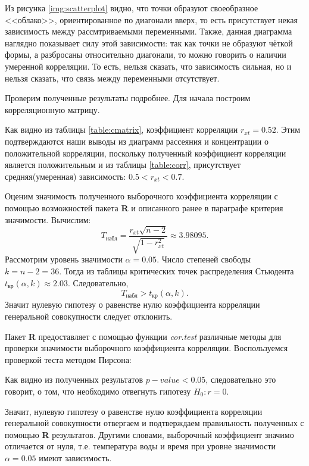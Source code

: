 Из рисунка \ref{img:scatterplot} видно, что точки образуют своеобразное <<облако>>, ориентированное по диагонали вверх, то есть присутствует некая зависимость между рассмтриваемыми переменными. Также, данная диаграмма наглядно показывает силу этой зависимости: так как точки не образуют чёткой формы, а разбросаны относительно диагонали, то можно говорить о наличии умеренной корреляции. То есть, нельзя сказать, что зависимость сильная, но и нельзя сказать, что связь между переменными отсутствует.

Проверим полученные результаты подробнее. Для начала построим корреляционную матрицу.

Как видно из таблицы \ref{table:cmatrix}, коэффициент корреляции $r_{xt} = 0.52$. Этим подтверждаются наши выводы из диаграмм рассеяния и концентрации о положительной корреляции, поскольку полученный коэффициент корреляции является положительным и из таблицы \ref{table:corr}, присутствует средняя(умеренная) зависимость: $0.5 < r_{xt} < 0.7$. 

Оценим значимость полученного выборочного коэффициента корреляции с помощью возможностей пакета \textbf{R} и описанного ранее в параграфе критерия значимости. Вычислим:
\begin{equation*}
	T_{\textrm{набл}} = \frac{r_{xt} \sqrt{n - 2}}{\sqrt{1 - r_{xt}^2}} \approx 3.98095.
\end{equation*}
Рассмотрим уровень значимости $\alpha = 0.05$. Число степеней свободы $k = n - 2 = 36$. Тогда из таблицы критических точек распределения Стьюдента $t_\textrm{кр}(\alpha, k) \approx 2.03$. Следовательно,
\begin{equation*}
	T_{\textrm{набл}} > t_\textrm{кр}(\alpha, k).
\end{equation*}
Значит нулевую гипотезу о равенстве нулю коэффициента корреляции генеральной совокупности следует отклонить.

Пакет \textbf{R} предоставляет с помощью функции \textit{cor.test} различные методы для проверки значимости выборочного коэффициента корреляции. Воспользуемся проверкой теста методом Пирсона:

Как видно из полученных результатов $p-value < 0.05$, следовательно это говорит, о том, что необходимо отвегнуть гипотезу $H_0: r = 0$.

Значит, нулевую гипотезу о равенстве нулю коэффициента корреляции генеральной совокупности отвергаем и подтверждаем правильность полученных с помощью \textbf{R} результатов. Другими словами, выборочный коэффициент значимо отличается от нуля, т.е. температура воды и время при уровне значимости $\alpha = 0.05$ имеют зависимость.

